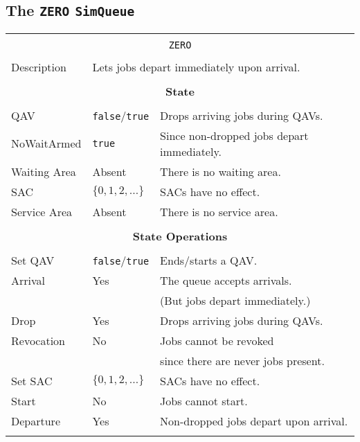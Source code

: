 \documentclass[12pt]{book}
\begin{document}
\subsection{The \lstinline{ZERO} \lstinline{SimQueue}}

\begin{tabular}{|l|l|l|}
\hline
\multicolumn{3}{|c|}{} \\
\multicolumn{3}{|c|}{\lstinline[basicstyle=\large]{ZERO}} \\
\multicolumn{3}{|c|}{} \\
\hline
Description & \multicolumn{2}{|l|}{Lets jobs depart immediately upon arrival.} \\
\hline
\multicolumn{3}{|c|}{} \\
\multicolumn{3}{|c|}{\bf State} \\
\multicolumn{3}{|c|}{} \\
\hline
QAV & \lstinline|false|/\lstinline|true| & Drops arriving jobs during QAVs. \\
\hline
NoWaitArmed & \lstinline|true| & Since non-dropped jobs depart immediately. \\
\hline
Waiting Area & Absent & There is no waiting area. \\
\hline
SAC & $\{0, 1, 2, \ldots\}$ & SACs have no effect. \\
\hline
Service Area & Absent & There is no service area. \\
\hline
\multicolumn{3}{|c|}{} \\
\multicolumn{3}{|c|}{\bf State Operations} \\
\multicolumn{3}{|c|}{} \\
\hline
Set QAV & \lstinline|false|/\lstinline|true| & Ends/starts a QAV. \\
\hline
Arrival & Yes & The queue accepts arrivals. \\
        &     & (But jobs depart immediately.) \\
\hline
Drop & Yes & Drops arriving jobs during QAVs. \\
\hline
Revocation & No & Jobs cannot be revoked \\
           &    & since there are never jobs present. \\
\hline
Set SAC & $\{0, 1, 2, \ldots\}$ & SACs have no effect. \\
\hline
Start & No & Jobs cannot start. \\
\hline
Departure & Yes & Non-dropped jobs depart upon arrival. \\
\hline
\multicolumn{3}{|c|}{} \\

\end{tabular}
\end{document}

